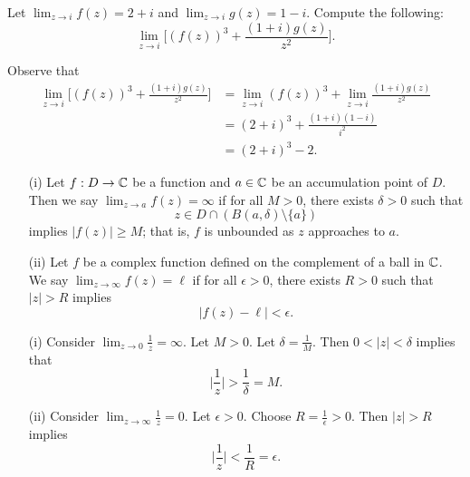 \documentclass[a4paper]{report}
\begin{document}
\begin{problem}
    Let \( \lim_{ z \to i } f(z) = 2 + i    \) and \( \lim_{ z \to i }  g(z) = 1 - i  \). Compute the following:
    \[ \lim_{ z \to i }  \Big[ (f(z))^{3} + \frac{ (1+i) g(z) }{ z^{2} } \Big]. \]
\end{problem} 
\begin{solution}
Observe that 
\begin{align*}
  \lim_{ z \to i }  \Big[(f(z))^{3} + \frac{ (1+i) g(z) }{ z^{2} } \Big]  &= \lim_{ z \to i }  (f(z))^{3} + \lim_{ z \to i }  \frac{ (1+i) g(z)  }{ z^{2} }  \\
                                                                          &= (2+i)^{3} + \frac{ (1+i) (1-i) }{ i^{2} } \\
                                                                          &= (2+i)^{3} -2. 
\end{align*}
\end{solution}

\begin{definition}
    \begin{enumerate}
        \item[(i)] Let \( f: D \to \mathbb{C}  \) be a function and \( a \in \mathbb{C}  \) be an accumulation point of \( D  \). Then we say \( \lim_{ z \to a } f(z) = \infty   \) if for all \( M > 0  \), there exists \( \delta > 0  \) such that
            \[  z \in D \cap (B(a,\delta) \setminus  \{ a \} ) \]
            implies \( | f(z) | \geq  M \); that is, \( f  \) is unbounded as \( z  \) approaches to \( a  \).
        \item[(ii)] Let \( f  \) be a complex function defined on the complement of a ball in \( \mathbb{C}  \). We say \( \lim_{ z \to \infty  } f(z) = \ell  \) if for all \( \epsilon > 0  \), there exists \( R > 0  \) such that \( | z  |  > R  \) implies 
            \[  | f(z) - \ell  | < \epsilon. \]
    \end{enumerate}
\end{definition}

\begin{eg}
    \begin{enumerate}
        \item[(i)] Consider \( \lim_{ z \to 0 }  \frac{ 1 }{ z }  = \infty   \). Let \( M > 0  \). Let \( \delta = \frac{ 1 }{ M }  \). Then \( 0 < | z  |  < \delta \) implies that 
            \[  \Big| \frac{ 1 }{ z }  \Big| > \frac{ 1 }{ \delta } = M. \]
        \item[(ii)] Consider \( \lim_{ z \to \infty  }   \frac{ 1 }{ z }  = 0.  \)
            Let \( \epsilon > 0  \). Choose \( R = \frac{ 1 }{ \epsilon } > 0  \). Then 
            \(  | z  |  > R  \) implies 
            \[  \Big| \frac{ 1 }{ z }  \Big| < \frac{ 1 }{ R } = \epsilon. \]
    \end{enumerate}
\end{eg}
\end{document}

